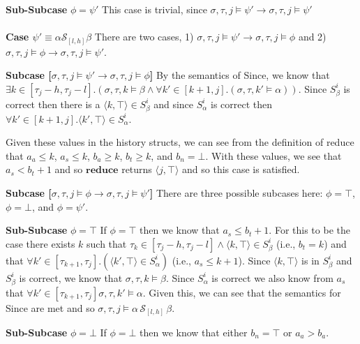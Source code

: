 \documentclass[10pt,a4paper]{article}
\newcommand{\rp}[2]{\ensuremath{\langle #1, #2 \rangle}}
\begin{document}
\hspace{2em} \textbf{Sub-Subcase} $\phi = \psi'$
This case is trivial, since $\sigma,\tau,j\vDash \psi' \rightarrow \sigma,\tau,j\vDash \psi'$
\\ \\
\noindent \textbf{Case $\psi' \equiv \alpha \mathcal{S}_{[l,h]} \beta$}
There are two cases, 1) $\sigma, \tau, j \vDash \psi' \rightarrow \sigma, \tau, j \vDash \phi$ and 2) $\sigma, \tau, j \vDash \phi \rightarrow \sigma, \tau, j \vDash \psi'$.

\textbf{Subcase [$\sigma, \tau, j \vDash \psi' \rightarrow \sigma, \tau, j \vDash \phi$]} 
By the semantics of Since, we know that $\exists k \in [\tau_j-h,\tau_j-l].(\sigma, \tau, k \vDash \beta \wedge \forall k' \in [k+1,j].(\sigma, \tau, k' \vDash \alpha))$. Since $S^i_{\beta}$ is correct then there is a $\rp{k}{\top} \in S^i_{\beta}$ and since $S^i_\alpha$ is correct then $\forall k' \in [k+1,j]. \rp{k'}{\top} \in S^i_\alpha$.

Given these values in the history structs, we can see from the definition of reduce that $a_a \leq k$, $a_s \leq k$, $b_a \geq k$, $b_t \geq k$, and $b_n = \bot$. With these values, we see that $a_s < b_t + 1$ and so $\mathbf{reduce}$ returns $\rp{j}{\top}$ and so this case is satisfied.

\textbf{Subcase [$\sigma, \tau, j \vDash \phi \rightarrow \sigma, \tau, j \vDash \psi'$]}
There are three possible subcases here: $\phi = \top$, $\phi = \bot$, and $\phi = \psi'$.

\hspace{2em} \textbf{Sub-Subcase} $\phi = \top$
If $\phi = \top$ then we know that $a_s \leq b_t + 1$. For this to be the case there exists $k$ such that $\tau_k \in [\tau_j-h,\tau_j-l] \wedge \rp{k}{\top} \in S^i_\beta$ (i.e., $b_t = k$) and that $\forall k' \in [\tau_{k+1},\tau_j].(\rp{k'}{\top} \in S^i_\alpha)$ (i.e., $a_s \leq k+1$). Since $\rp{k}{\top}$ is in $S^i_\beta$ and $S^i_\beta$ is correct, we know that $\sigma,\tau,k \vDash \beta$. Since $S^i_\alpha$ is correct we also know from $a_s$ that $\forall k' \in [\tau_{k+1},\tau_j] \sigma, \tau, k' \vDash \alpha$. Given this, we can see that the semantics for Since are met and so $\sigma, \tau, j \vDash \alpha\, \mathcal{S}_{[l,h]}\, \beta$.

\hspace{2em} \textbf{Sub-Subcase} $\phi = \bot$
If $\phi = \bot$ then we know that either $b_n = \top$ or $a_a > b_a$. 
\end{document}
